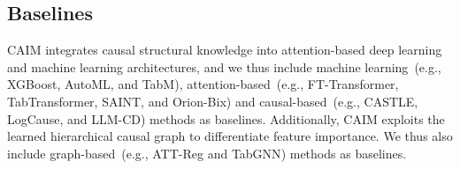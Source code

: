 \documentclass[sigconf, nonacm]{acmart}
\newcommand{\syadd}[1]{{\color{black}#1}}
\newcommand{\syfix}[1]{{\color{black}#1}}
\newcommand{\vldb}[1]{{\color{red}#1}}
\newcommand*{\ourmodel}{CAIM}
\begin{document}
\subsection{Baselines}
\syfix{\ourmodel{} integrates causal structural knowledge into attention-based deep learning and machine learning architectures, and we thus include machine learning~\vldb{(e.g., XGBoost\cite{r:xgboost}, AutoML\cite{r:automl}, and TabM\cite{r:tabm})}, attention-based~\vldb{(e.g., FT-Transformer\cite{r:ft-transformer}, TabTransformer\cite{r:tab}, SAINT\cite{r:SAINT}, and Orion-Bix\cite{r:orionbix})} and causal-based~\vldb{(e.g., CASTLE\cite{r:CASTLE}, LogCause\cite{r:linear}, and LLM-CD\cite{r:llmcd})} methods as baselines.
Additionally, \ourmodel{} exploits the learned hierarchical causal graph to differentiate feature importance. 
We thus also include graph-based~\vldb{(e.g., ATT-Reg\cite{r:attreg} and TabGNN\cite{r:gnnbased})} methods as baselines.}

\end{document}
